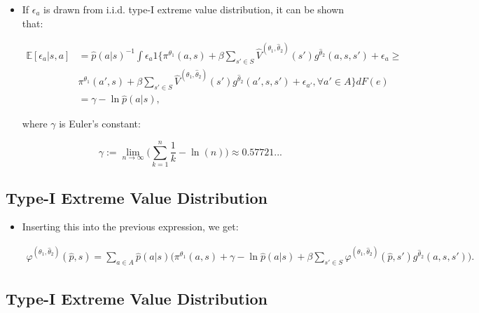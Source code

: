 \documentclass[]{book}
\providecommand{\tightlist}{%
  \setlength{\itemsep}{0pt}\setlength{\parskip}{0pt}}
\begin{document}
\begin{itemize}
\tightlist
\item
  If \(\epsilon_a\) is drawn from i.i.d. type-I extreme value
  distribution, it can be shown that:

  \begin{equation}
  \begin{split}
  \mathbb{E}[\epsilon_{a}|s, a] &= \hat{p}(a|s)^{-1} \int \epsilon_a 1\Bigg\{\pi^{\theta_1}(a , s) + \beta \sum_{s' \in S} \hat{V}^{(\theta_1, \hat{\theta}_2)}(s') g^{\hat{\theta}_2}(a, s, s') + \epsilon_a \ge\\
  &\pi^{\theta_1}(a' , s) + \beta \sum_{s' \in S} \hat{V}^{(\theta_1, \hat{\theta}_2)}(s') g^{\hat{\theta}_2}(a', s, s') + \epsilon_{a'}, \forall a' \in A \Bigg\}dF(e)\\
  &= \gamma - \ln \hat{p}(a|s),
  \end{split}
  \end{equation}

  where \(\gamma\) is Euler's constant:

  \begin{equation}
  \gamma := \lim_{n \to \infty} \Bigg(\sum_{k = 1}^n \frac{1}{k} - \ln(n) \Bigg) \approx 0.57721...
  \end{equation}
\end{itemize}

\subsection{Type-I Extreme Value
Distribution}\label{type-i-extreme-value-distribution-2}

\begin{itemize}
\tightlist
\item
  Inserting this into the previous expression, we get:

  \begin{equation}
  \begin{split}
  \varphi^{(\theta_1, \hat{\theta}_2)}(\hat{p}, s) = \sum_{a \in A}\hat{p}(a|s)\Bigg(\pi^{\theta_1}(a, s) + \gamma - \ln \hat{p}(a|s) + \beta \sum_{s' \in S} \varphi^{(\theta_1, \hat{\theta}_2)}(\hat{p}, s') g^{\hat{\theta}_2}(a, s, s')  \Bigg).
  \end{split}
  \end{equation}
\end{itemize}

\subsection{Type-I Extreme Value
Distribution}\label{type-i-extreme-value-distribution-3}
\end{document}
